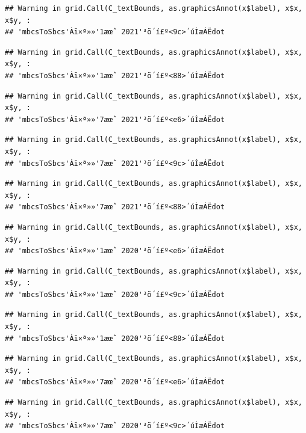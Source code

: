 \documentclass[
]{book}
\begin{document}
\begin{verbatim}
## Warning in grid.Call(C_textBounds, as.graphicsAnnot(x$label), x$x, x$y, :
## 'mbcsToSbcs'Àï×ª»»'1æœˆ 2021'³ö´í£º<9c>´úÌæÁËdot
\end{verbatim}

\begin{verbatim}
## Warning in grid.Call(C_textBounds, as.graphicsAnnot(x$label), x$x, x$y, :
## 'mbcsToSbcs'Àï×ª»»'1æœˆ 2021'³ö´í£º<88>´úÌæÁËdot
\end{verbatim}

\begin{verbatim}
## Warning in grid.Call(C_textBounds, as.graphicsAnnot(x$label), x$x, x$y, :
## 'mbcsToSbcs'Àï×ª»»'7æœˆ 2021'³ö´í£º<e6>´úÌæÁËdot
\end{verbatim}

\begin{verbatim}
## Warning in grid.Call(C_textBounds, as.graphicsAnnot(x$label), x$x, x$y, :
## 'mbcsToSbcs'Àï×ª»»'7æœˆ 2021'³ö´í£º<9c>´úÌæÁËdot
\end{verbatim}

\begin{verbatim}
## Warning in grid.Call(C_textBounds, as.graphicsAnnot(x$label), x$x, x$y, :
## 'mbcsToSbcs'Àï×ª»»'7æœˆ 2021'³ö´í£º<88>´úÌæÁËdot
\end{verbatim}

\begin{verbatim}
## Warning in grid.Call(C_textBounds, as.graphicsAnnot(x$label), x$x, x$y, :
## 'mbcsToSbcs'Àï×ª»»'1æœˆ 2020'³ö´í£º<e6>´úÌæÁËdot
\end{verbatim}

\begin{verbatim}
## Warning in grid.Call(C_textBounds, as.graphicsAnnot(x$label), x$x, x$y, :
## 'mbcsToSbcs'Àï×ª»»'1æœˆ 2020'³ö´í£º<9c>´úÌæÁËdot
\end{verbatim}

\begin{verbatim}
## Warning in grid.Call(C_textBounds, as.graphicsAnnot(x$label), x$x, x$y, :
## 'mbcsToSbcs'Àï×ª»»'1æœˆ 2020'³ö´í£º<88>´úÌæÁËdot
\end{verbatim}

\begin{verbatim}
## Warning in grid.Call(C_textBounds, as.graphicsAnnot(x$label), x$x, x$y, :
## 'mbcsToSbcs'Àï×ª»»'7æœˆ 2020'³ö´í£º<e6>´úÌæÁËdot
\end{verbatim}

\begin{verbatim}
## Warning in grid.Call(C_textBounds, as.graphicsAnnot(x$label), x$x, x$y, :
## 'mbcsToSbcs'Àï×ª»»'7æœˆ 2020'³ö´í£º<9c>´úÌæÁËdot
\end{verbatim}
\end{document}
